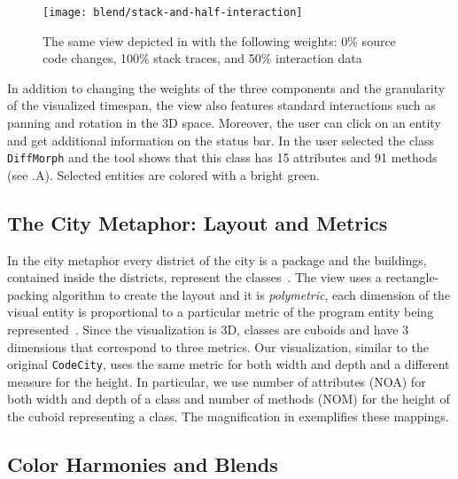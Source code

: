 \begin{figure}[t]
\centering
\texttt{[image: blend/stack-and-half-interaction]}
\caption[The view depicted in ]{The same view depicted in  with the following weights: 0\% source code changes, 100\% stack traces, and 50\% interaction data}
\label{fig:stack-and-half-interaction}
\end{figure}

In addition to changing the weights of the three components and the granularity of the visualized timespan, the view also features standard interactions such as panning and rotation in the 3D space.
Moreover, the user can click on an entity and get additional information on the status bar.
In  the user selected the class \texttt{DiffMorph} and the tool shows that this class has 15 attributes and 91 methods (see .A).
Selected entities are colored with a bright green.


\subsection{The City Metaphor: Layout and Metrics}

In the city metaphor every  district of the city is a package and the buildings, contained inside the districts, represent the classes~\cite{Wett2007}.
The view uses a rectangle-packing algorithm to create the layout and it is \emph{polymetric}, \ie each dimension of the visual entity is proportional to a particular metric of the program entity being represented~\cite{Lanz2004}.
Since the visualization is 3D, classes are cuboids and have 3 dimensions that correspond to three metrics.
Our visualization, similar to the original \texttt{CodeCity}, uses the same metric for both width and depth and a different measure for the height.
In particular, we use number of attributes (\ie NOA) for both width and depth of a class and number of methods (\ie NOM) for the height of the cuboid representing a class.
The magnification in  exemplifies these mappings.

\subsection{Color Harmonies and Blends}

